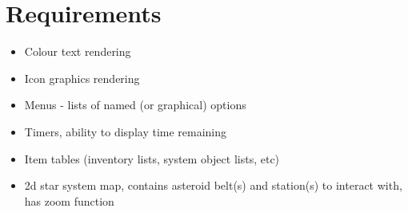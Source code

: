 \documentclass[a4paper,10pt]{article}
\begin{document}
\section{Requirements}

\begin{itemize}
    \item Colour text rendering
    \item Icon graphics rendering
    \item Menus - lists of named (or graphical) options
    \item Timers, ability to display time remaining
    \item Item tables (inventory lists, system object lists, etc)
    \item 2d star system map, contains asteroid belt(s) and station(s) to
        interact with, has zoom function
\end{itemize}
\end{document}
